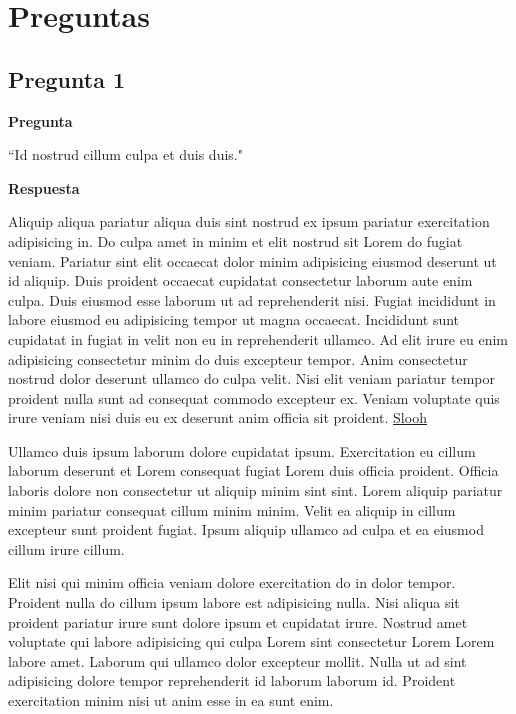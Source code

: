 \section{Preguntas} \label{sec:preguntas}

\subsection{Pregunta 1} \label{subsec:pregunta1}

\noindent \textbf{Pregunta} 

``Id nostrud cillum culpa et duis duis."

\noindent \textbf{Respuesta} 


Aliquip aliqua pariatur aliqua duis sint nostrud ex ipsum pariatur exercitation adipisicing in. Do culpa amet in minim et elit nostrud sit Lorem do fugiat veniam. Pariatur sint elit occaecat dolor minim adipisicing eiusmod deserunt ut id aliquip. Duis proident occaecat cupidatat consectetur laborum aute enim culpa. Duis eiusmod esse laborum ut ad reprehenderit nisi. Fugiat incididunt in labore eiusmod eu adipisicing tempor ut magna occaecat.
Incididunt sunt cupidatat in fugiat in velit non eu in reprehenderit ullamco. Ad elit irure eu enim adipisicing consectetur minim do duis excepteur tempor. Anim consectetur nostrud dolor deserunt ullamco do culpa velit. Nisi elit veniam pariatur tempor proident nulla sunt ad consequat commodo excepteur ex. Veniam voluptate quis irure veniam nisi duis eu ex deserunt anim officia sit proident. \href{https://www.slooh.com/}{Slooh}

Ullamco duis ipsum laborum dolore cupidatat ipsum. Exercitation eu cillum laborum deserunt et Lorem consequat fugiat Lorem duis officia proident. Officia laboris dolore non consectetur ut aliquip minim sint sint. Lorem aliquip pariatur minim pariatur consequat cillum minim minim. Velit ea aliquip in cillum excepteur sunt proident fugiat. Ipsum aliquip ullamco ad culpa et ea eiusmod cillum irure cillum.

Elit nisi qui minim officia veniam dolore exercitation do in dolor tempor. Proident nulla do cillum ipsum labore est adipisicing nulla. Nisi aliqua sit proident pariatur irure sunt dolore ipsum et cupidatat irure. Nostrud amet voluptate qui labore adipisicing qui culpa Lorem sint consectetur Lorem Lorem labore amet. Laborum qui ullamco dolor excepteur mollit. Nulla ut ad sint adipisicing dolore tempor reprehenderit id laborum laborum id. Proident exercitation minim nisi ut anim esse in ea sunt enim.

